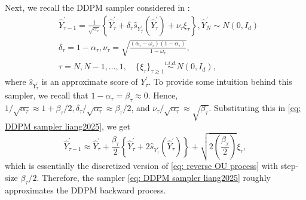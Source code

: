 \documentclass{article}
\theoremstyle{plain}
\theoremstyle{definition}
\theoremstyle{remark}
\newcommand{\bc}[1]{\left\{{#1}\right\}}
\newcommand{\br}[1]{\left({#1}\right)}
\begin{document}
Next, we recall the DDPM sampler considered in \citet{liang2025low, huang2024denoising, li2024adapting}:  
\begin{equation}
    \label{eq: DDPM sampler liang2025}
    \begin{aligned}
    & \hat Y^\prime_{\tau -1} = \frac{1}{\sqrt{\alpha_\tau}} \bc{ \hat Y^\prime_\tau + \delta_\tau \widehat s_{Y^\prime_\tau}(\hat Y^\prime_\tau) + \nu_\tau \xi_\tau}, \hat Y^\prime_N \sim N(0, I_d)\\
    & \delta_\tau = 1 - \alpha_\tau,  \nu_\tau = \sqrt{\frac{(\alpha_\tau - \omega_\tau)(1 - \alpha_\tau)}{1 - \omega_\tau}},\\
    & \tau   = N , N-1, \ldots, 1, \quad \{\xi_\tau\}_{\tau \ge 1} \overset{i.i.d.}{\sim} N(0,I_d),
    \end{aligned}
\end{equation}
where $ \widehat s_{Y^\prime_\tau}$ is an approximate score of $Y^\prime_\tau$.
To provide some intuition behind this sampler, we recall that $1 - \alpha_\tau = \beta_\tau \approx 0$. Hence, $1/\sqrt{\alpha_\tau}  \approx 1 + \beta_\tau/2, \delta_\tau/ \sqrt{\alpha_\tau} \approx \beta_\tau / 2$, and $\nu_\tau/ \sqrt{\alpha_\tau} \approx \sqrt{\beta_\tau }$. Substituting this in \eqref{eq: DDPM sampler liang2025}, we get 
\begin{equation}
\label{eq: vanilla SDE sampler}
\hat Y^\prime_{\tau -1}  
 \approx \hat Y^\prime_\tau + \frac{\beta_\tau}{2} \bc{\hat Y^\prime_\tau  + 2 \widehat s_{Y^\prime_\tau} (\hat Y^\prime_\tau)} + \sqrt{2 \br{\frac{\beta_{\tau}}{2}}} \xi_\tau,
 \end{equation}
 which is essentially the discretized version of \eqref{eq: reverse OU process} with step-size $\beta_\tau/ 2$. Therefore, the sampler \eqref{eq: DDPM sampler liang2025} roughly approximates the DDPM backward process. 
 
\end{document}
